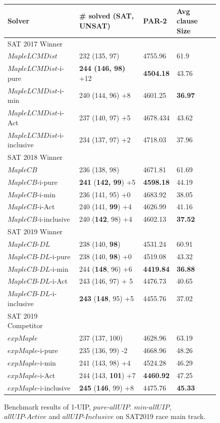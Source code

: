 \documentclass[runningheads]{llncs}
\newcommand{\allUipPure}{\textit{pure-allUIP}\xspace}
\newcommand{\allUipMin}{\textit{min-allUIP}\xspace}
\newcommand{\allUipAct}{\textit{allUIP-Active}}
\newcommand{\allUipIn}{\textit{allUIP-Inclusive}}
\newcommand{\MapleSeven}{\textit{MapleLCMDist}}
\newcommand{\MapleNineShort}{\textit{MapleCB-DL} }
\newcommand{\expSATShort}{\textit{expMaple} }
\newcommand{\MapleEightShort}{\textit{MapleCB}}
\begin{document}
\begin{figure} 
\begin{center}
\begin{tabular}{ | m{3.7cm} | m{4cm}| m{2cm} | m{2.75cm} |  } 
\hline
Solver & \# solved (SAT, UNSAT) & PAR-2 & Avg clause Size \\ 
\hline
SAT 2017 Winner & & & \\
$\MapleSeven$ & 232 (135, 97) & 4755.96 & 61.9  \\ 
\hline
$\MapleSeven$-i-pure & \textbf{244 (146, 98)} +12 & \textbf{4504.18} & 43.76 \\
\hline
$\MapleSeven$-i-min & 240 (144, 96) +8 & 4601.25 & \textbf{36.97} \\ 
\hline
$\MapleSeven$-i-Act & 237 (140, 97) +5 & 4678.434 & 43.62 \\ 
\hline
$\MapleSeven$-i-inclusive & 234 (137, 97) +2 & 4718.03 & 37.96 \\
\hline
\hline
SAT 2018 Winner & & & \\
$\MapleEightShort$ & 236 (138, 98) & 4671.81 & 61.69 \\
\hline
$\MapleEightShort$-i-pure & \textbf{241} (\textbf{142, 99}) +5 & \textbf{4598.18} & 44.19 \\
\hline
$\MapleEightShort$-i-min & 236 (141, 95) +0 & 4683.92 & 38.05 \\ 
\hline
$\MapleEightShort$-i-Act & 240 (141, \textbf{99}) +4 & 4626.99 & 41.16 \\
\hline
$\MapleEightShort$-i-inclusive & 240 (\textbf{142}, 98) +4 & 4602.13 & \textbf{37.52} \\
\hline
\hline
SAT 2019 Winner & & & \\
$\MapleNineShort$ & 238 (140, \textbf{98}) & 4531.24 & 60.91 \\
\hline
$\MapleNineShort$-i-pure & 238 (140, \textbf{98}) +0 & 4519.08 &  43.32\\
\hline
$\MapleNineShort$-i-min & 244 (\textbf{148}, 96) +6 & \textbf{4419.84} & \textbf{36.88} \\
\hline
$\MapleNineShort$-i-Act & 243 (146, 97) + 5 & 4476.73 & 40.65 \\
\hline
$\MapleNineShort$-i-inclusive & \textbf{243} (\textbf{148}, 95) +5 & 4455.76 & 37.02 \\
\hline
\hline
SAT 2019 Competitor & & &\\
$\expSATShort$ & 237 (137, 100)  & 4628.96 & 63.19 \\
\hline
$\expSATShort$-i-pure & 235 (136, 99) -2  & 4668.96 & 48.26 \\
\hline
$\expSATShort$-i-min & 241 (143, 98) +4 & 4524.28 & 46.29 \\ 
\hline
$\expSATShort$-i-Act & 244 (143, \textbf{101}) +7 & \textbf{4460.92} & 47.25 \\
\hline
$\expSATShort$-i-inclusive & \textbf{245} (\textbf{146}, 99) +8 & 4475.76 & \textbf{45.33} \\
\hline
\end{tabular}
\end{center}
\caption{Benchmark results of 1-UIP, $\allUipPure$. $\allUipMin$, $\allUipAct$ and $\allUipIn$ on SAT2019 race main track.}
\label{fig:t5}
\end{figure}
\end{document}
